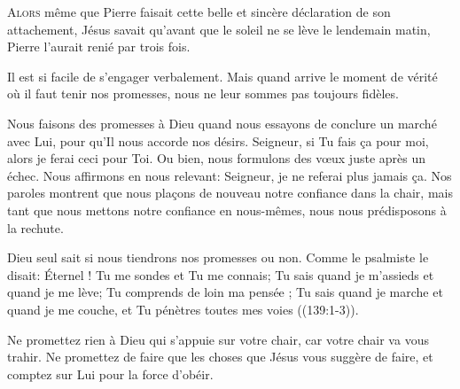 \dvrule








\lettrine{A}{lors} même que Pierre faisait cette belle
 et sincère déclaration de son attachement,
 Jésus savait qu'avant que le soleil ne se lève le lendemain matin,
 Pierre l'aurait renié par trois fois.

Il est si facile de s'engager verbalement.
 Mais quand arrive le moment de vérité où il faut tenir nos promesses,
 nous ne leur sommes pas toujours fidèles.


Nous faisons des promesses à Dieu quand nous essayons de conclure
 un marché avec Lui, pour qu'Il nous accorde nos désirs.
 \Og Seigneur, si Tu fais \c{c}a pour moi, alors je ferai  ceci pour Toi. \Fg{}
 Ou bien,  nous formulons des v\oe{}ux juste après un échec.
 Nous affirmons en nous relevant: 
 \Og Seigneur, je ne referai plus jamais \c{c}a. \Fg{}
 Nos paroles montrent que nous pla\c{c}ons de nouveau notre confiance
 dans la chair, mais tant que nous mettons notre confiance en nous-mêmes,
 nous nous prédisposons à la rechute.

Dieu seul sait si nous tiendrons nos promesses ou non.
 Comme le psalmiste le disait: 
 \Og Éternel ! Tu me sondes et Tu me connais; Tu sais quand je m'assieds
 et quand je me lève; Tu comprends de loin ma pensée ;
 Tu sais quand je marche et quand je me couche,
 et Tu pénètres toutes mes voies \Fg{} ((139:1-3)).

Ne promettez rien à Dieu qui s'appuie sur votre chair,
 car votre chair va vous trahir.
 Ne promettez de faire que les choses que Jésus vous suggère de faire,
 et comptez sur Lui pour la force d'obéir.

